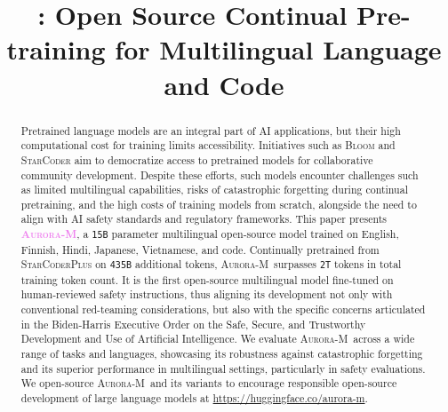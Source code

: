 \documentclass[11pt]{article}
\title{\textsc{\system}: Open Source Continual Pre-training for Multilingual Language and Code}
\newcommand{\system}{\textsc{Aurora-M}}
\begin{document}
\setlength{}
\maketitle
\begin{abstract}
Pretrained language models are an integral part of AI applications, but their high computational cost for training limits accessibility. 
Initiatives such as \textsc{Bloom} and \textsc{StarCoder} aim to democratize access to pretrained models for collaborative community development. 
Despite these efforts, such models encounter challenges such as limited multilingual capabilities, risks of catastrophic forgetting during continual pretraining, and the high costs of training models from scratch, alongside the need to align with AI safety standards and regulatory frameworks.
%
This paper presents \textbf{\textcolor{violet}{\system}}, a \texttt{15B} parameter multilingual open-source model trained on English, Finnish, Hindi, Japanese, Vietnamese, and code. Continually pretrained from \textsc{StarCoderPlus} on \texttt{435B} additional tokens, \system\ surpasses \texttt{2T} tokens in total training token count. It is the first open-source multilingual model fine-tuned on human-reviewed safety instructions, thus aligning its development not only with conventional red-teaming considerations, but also with the specific concerns articulated in the Biden-Harris Executive Order on the Safe, Secure, and Trustworthy Development and Use of Artificial Intelligence.
%
We evaluate \system\ across a wide range of tasks and languages, showcasing its robustness against catastrophic forgetting and its superior performance in multilingual settings, particularly in safety evaluations. We open-source \system\ and its variants to encourage responsible open-source development of large language models at \url{https://huggingface.co/aurora-m}.

\end{abstract}
\end{document}
